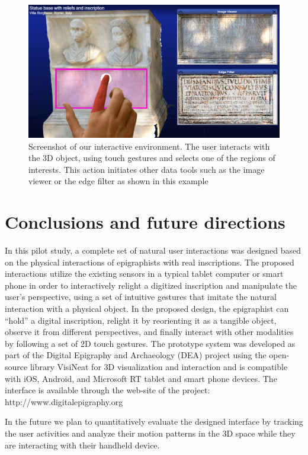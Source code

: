 \documentclass[amsthm,ebook]{saparticle}
\begin{document}
\begin{figure}[!bp]
\centering
 \includegraphics[width=\columnwidth]{EAGLE2016cameraready-img006.png}
\caption{Screenshot of our interactive environment. The user interacts with the 3D object, using touch gestures and
selects one of the regions of interests. This action initiates other data tools such as the image viewer or the edge
filter as shown in this example}
\label{fig:4}
\end{figure}

\section{Conclusions and future directions}


In this pilot study, a complete set of natural user interactions was designed based on the physical interactions of
epigraphists with real inscriptions. The proposed interactions utilize the existing sensors in a typical tablet
computer or smart phone in order to interactively relight a digitized inscription and manipulate the user's
perspective, using a set of intuitive gestures that imitate the natural interaction with a physical object. In the
proposed design, the epigraphist can ``hold'' a digital inscription, relight it by
reorienting it as a tangible object, observe it from different perspectives, and finally interact with other modalities
by following a set of 2D touch gestures. The prototype system was developed as part of the Digital Epigraphy and
Archaeology (DEA) project using the open-source library VisiNeat for 3D visualization and interaction and is compatible
with iOS, Android, and Microsoft RT tablet and smart phone devices. The interface is available through the web-site of
the project: http://www.digitalepigraphy.org

In the future we plan to quantitatively evaluate the designed interface by tracking the user activities and analyze
their motion patterns in the 3D space while they are interacting with their handheld device. 
\end{document}
